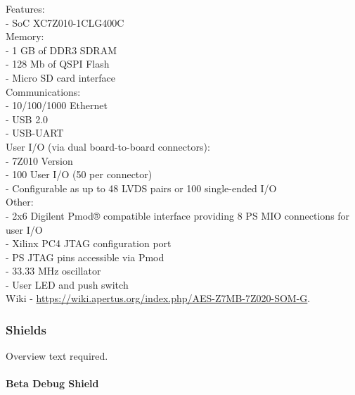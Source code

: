 Features:\\


- SoC XC7Z010-1CLG400C\\
    
    
Memory:\\

- 1 GB of DDR3 SDRAM\\
- 128 Mb of QSPI Flash\\
- Micro SD card interface\\


Communications:\\

- 10/100/1000 Ethernet\\
- USB 2.0\\
- USB-UART\\

User I/O (via dual board-to-board connectors):\\

- 7Z010 Version\\
- 100 User I/O (50 per connector)\\
- Configurable as up to 48 LVDS pairs or 100 single-ended I/O\\

Other:\\

- 2x6 Digilent Pmod® compatible interface providing 8 PS MIO connections for user I/O\\
- Xilinx PC4 JTAG configuration port\\
- PS JTAG pins accessible via Pmod\\
- 33.33 MHz oscillator\\
- User LED and push switch\\


Wiki - \href{https://wiki.apertus.org/index.php/AES-Z7MB-7Z020-SOM-G}{https://wiki.apertus.org/index.php/AES-Z7MB-7Z020-SOM-G}.\\







\subsubsection{Shields}

Overview text required.\\

\paragraph{Beta Debug Shield}\mbox{}\\

